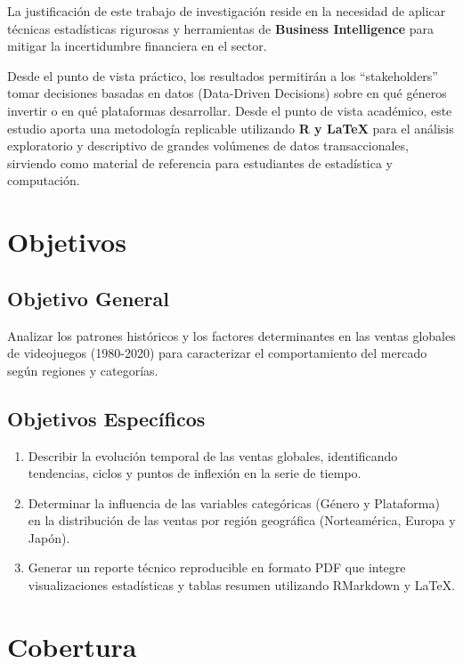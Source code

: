 \documentclass[oneside,11pt]{Latex/Classes/PhDthesisPSnPDF}
\begin{document}
La justificación de este trabajo de investigación reside en la necesidad
de aplicar técnicas estadísticas rigurosas y herramientas de
\textbf{Business Intelligence} para mitigar la incertidumbre financiera
en el sector.

Desde el punto de vista práctico, los resultados permitirán a los
``stakeholders'' tomar decisiones basadas en datos (Data-Driven
Decisions) sobre en qué géneros invertir o en qué plataformas
desarrollar. Desde el punto de vista académico, este estudio aporta una
metodología replicable utilizando \textbf{R y LaTeX} para el análisis
exploratorio y descriptivo de grandes volúmenes de datos
transaccionales, sirviendo como material de referencia para estudiantes
de estadística y computación.

\section{Objetivos}

\subsection{Objetivo General}

Analizar los patrones históricos y los factores determinantes en las
ventas globales de videojuegos (1980-2020) para caracterizar el
comportamiento del mercado según regiones y categorías.

\subsection{Objetivos Específicos}

\begin{enumerate}
  \item Describir la evolución temporal de las ventas globales, identificando tendencias, ciclos y puntos de inflexión en la serie de tiempo.
  \item Determinar la influencia de las variables categóricas (Género y Plataforma) en la distribución de las ventas por región geográfica (Norteamérica, Europa y Japón).
  \item Generar un reporte técnico reproducible en formato PDF que integre visualizaciones estadísticas y tablas resumen utilizando RMarkdown y LaTeX.
\end{enumerate}

\section{Cobertura}
\end{document}
